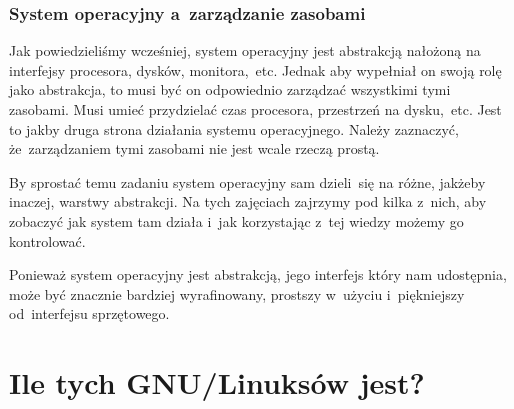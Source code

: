 \documentclass[10pt,t]{beamer}
\begin{document}





\begin{frame}
  \frametitle{System operacyjny a~zarządzanie zasobami}


  Jak powiedzieliśmy wcześniej, system operacyjny jest abstrakcją nałożoną
  na interfejsy procesora, dysków, monitora,~etc. Jednak aby wypełniał
  on swoją rolę jako abstrakcja, to musi być on odpowiednio
  \alert{zarządzać} wszystkimi tymi zasobami. Musi umieć przydzielać czas
  procesora, przestrzeń na dysku,~etc. Jest to jakby druga strona działania
  systemu operacyjnego. Należy zaznaczyć, że~zarządzaniem tymi zasobami nie
  jest wcale rzeczą prostą.

  By sprostać temu zadaniu system operacyjny sam dzieli~się na różne,
  jakżeby inaczej, warstwy abstrakcji. Na tych zajęciach zajrzymy pod kilka
  z~nich, aby zobaczyć jak system tam działa i~jak korzystając z~tej wiedzy
  możemy go kontrolować.

  Ponieważ system operacyjny jest abstrakcją, jego interfejs który
  nam udostępnia, może być znacznie bardziej wyrafinowany, prostszy
  w~użyciu i~piękniejszy od~interfejsu sprzętowego.

\end{frame}






\section{Ile tych GNU/Linuksów jest?}
\end{document}
